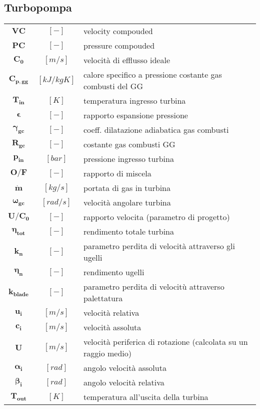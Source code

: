 \begin{multicols}{2}
	\subsection{Turbopompa}
	\begin{tabularx}{\linewidth}{ccX}
		$\bm{VC}$ & $[-]$ & velocity compouded\\
		$\bm{PC}$ & $[-]$ & pressure compouded\\
		$\bm{C_0}$ & $[m/s]$ & velocità di efflusso ideale\\
		$\bm{C_{p,gg}}$ & $[kJ/kgK]$ & calore specifico a pressione costante gas combusti del GG\\
		$\bm{T_{in}}$ & $[K]$ & temperatura ingresso turbina\\
		$\bm{\epsilon}$ & $[-]$ & rapporto espansione pressione\\
		$\bm{\gamma_{gc}}$ & $[-]$ & coeff. dilatazione adiabatica gas combusti \\
		$\bm{R_{gc}}$ & $[-]$ & costante gas combusti GG \\
		$\bm{p_{in}}$ & $[bar]$ & pressione ingresso turbina \\
		$\bm{O/F}$ & $[-]$ & rapporto di miscela\\
		$\bm{\dot{m}}$ & $[kg/s]$ & portata di gas in turbina\\
		$\bm{\omega_{gc}}$ & $[rad/s]$ & velocità angolare turbina \\
		$\bm{U/C_0}$ & $[-]$ & rapporto velocita (parametro di progetto) \\
		$\bm{\eta_{tot}}$ & $[-]$ & rendimento totale turbina \\
		$\bm{k_n}$ & $[-]$ & parametro perdita di velocità attraverso gli ugelli  \\
		$\bm{\eta_n}$ & $[-]$ & rendimento ugelli \\
		$\bm{k_{blade}}$ & $[-]$ & parametro perdita di velocitù attraverso palettatura \\
		$\bm{u_i}$ & $[m/s]$ & velocità relativa \\
		$\bm{c_i}$ & $[m/s]$ & velocità assoluta \\
		$\bm{U}$ & $[m/s]$ & velocità periferica di rotazione (calcolata su un raggio medio) \\
		$\bm{\alpha_i}$ & $[rad]$ & angolo velocità assoluta \\
		$\bm{\beta_i}$ & $[rad]$ & angolo velocità relativa \\
		$\bm{T_{out}}$ & $[K]$ & temperatura all'uscita della turbina
	\end{tabularx}


\end{multicols}
